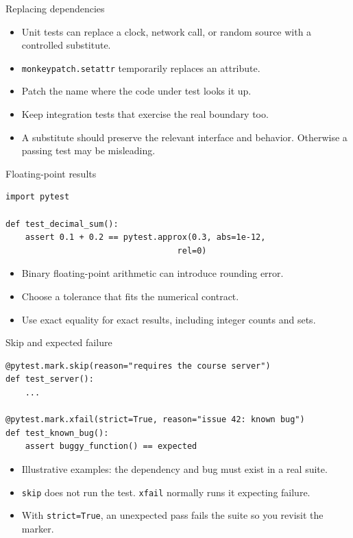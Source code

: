 \documentclass[aspectratio=169,11pt]{beamer}
\newcommand{\code}[1]{\texttt{#1}}
\begin{document}
\begin{frame}[fragile]{Replacing dependencies}
\begin{itemize}
\item Unit tests can replace a clock, network call, or random source with a controlled substitute.
\item \code{monkeypatch.setattr} temporarily replaces an attribute.
\item Patch the name where the code under test looks it up.
\item Keep integration tests that exercise the real boundary too.
\item A substitute should preserve the relevant interface and behavior. Otherwise a passing test may be misleading.
\end{itemize}
\end{frame}

\begin{frame}[fragile]{Floating-point results}
\begin{lstlisting}
import pytest

def test_decimal_sum():
    assert 0.1 + 0.2 == pytest.approx(0.3, abs=1e-12,
                                   rel=0)
\end{lstlisting}
\begin{itemize}
\item Binary floating-point arithmetic can introduce rounding error.
\item Choose a tolerance that fits the numerical contract.
\item Use exact equality for exact results, including integer counts and sets.
\end{itemize}
\end{frame}

\begin{frame}[fragile]{Skip and expected failure}
\begin{lstlisting}
@pytest.mark.skip(reason="requires the course server")
def test_server():
    ...

@pytest.mark.xfail(strict=True, reason="issue 42: known bug")
def test_known_bug():
    assert buggy_function() == expected
\end{lstlisting}
\begin{itemize}
\item Illustrative examples: the dependency and bug must exist in a real suite.
\item \code{skip} does not run the test. \code{xfail} normally runs it expecting failure.
\item With \code{strict=True}, an unexpected pass fails the suite so you revisit the marker.
\end{itemize}
\end{frame}
\end{document}
